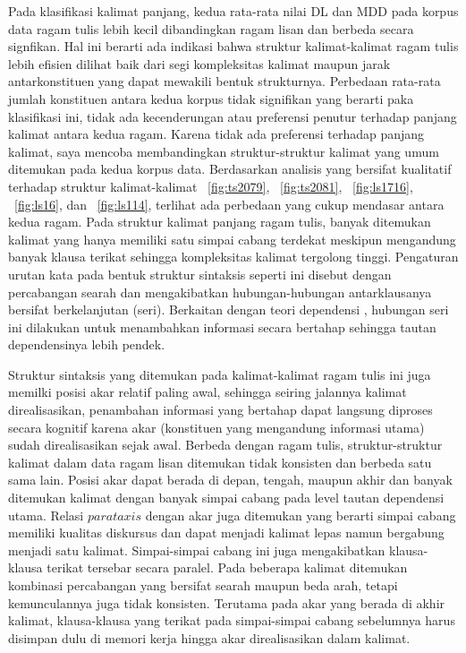 Pada klasifikasi kalimat panjang, kedua rata-rata nilai DL dan MDD pada korpus data ragam tulis lebih kecil dibandingkan ragam lisan dan berbeda secara signfikan. Hal ini berarti ada indikasi bahwa struktur kalimat-kalimat ragam tulis lebih efisien dilihat baik dari segi kompleksitas kalimat maupun jarak antarkonstituen yang dapat mewakili bentuk strukturnya. Perbedaan rata-rata jumlah konstituen antara kedua korpus tidak signifikan yang berarti paka klasifikasi ini, tidak ada kecenderungan atau preferensi penutur terhadap panjang kalimat antara kedua ragam. Karena tidak ada preferensi terhadap panjang kalimat, saya mencoba membandingkan struktur-struktur kalimat yang umum ditemukan pada kedua korpus data. Berdasarkan analisis yang bersifat kualitatif terhadap struktur kalimat-kalimat \pic~\ref{fig:ts2079}, \pic~\ref{fig:ts2081}, \pic~\ref{fig:ls1716}, \pic~\ref{fig:ls16}, dan \pic~\ref{fig:ls114}, terlihat ada perbedaan yang cukup mendasar antara kedua ragam. Pada struktur kalimat panjang ragam tulis, banyak ditemukan kalimat yang hanya memiliki satu simpai cabang terdekat meskipun mengandung banyak klausa terikat sehingga kompleksitas kalimat tergolong tinggi. Pengaturan urutan kata pada bentuk struktur sintaksis seperti ini disebut dengan percabangan searah dan mengakibatkan hubungan-hubungan antarklausanya bersifat berkelanjutan (seri). Berkaitan dengan teori dependensi \citep{tesniere1959elements, hawkins2014cross, gildea2010grammars}, hubungan seri ini dilakukan untuk menambahkan informasi secara bertahap sehingga tautan dependensinya lebih pendek. 

Struktur sintaksis yang ditemukan pada kalimat-kalimat ragam tulis ini juga memilki posisi akar relatif paling awal, sehingga seiring jalannya kalimat direalisasikan, penambahan informasi yang bertahap dapat langsung diproses secara kognitif karena akar (konstituen yang mengandung informasi utama) sudah direalisasikan sejak awal. Berbeda dengan ragam tulis, struktur-struktur kalimat dalam data ragam lisan ditemukan tidak konsisten dan berbeda satu sama lain. Posisi akar dapat berada di depan, tengah, maupun akhir dan banyak ditemukan kalimat dengan banyak simpai cabang pada level tautan dependensi utama. Relasi $parataxis$ dengan akar juga ditemukan yang berarti simpai cabang memiliki kualitas diskursus dan dapat menjadi kalimat lepas namun bergabung menjadi satu kalimat. Simpai-simpai cabang ini juga mengakibatkan klausa-klausa terikat tersebar secara paralel. Pada beberapa kalimat ditemukan kombinasi percabangan yang bersifat searah maupun beda arah, tetapi kemunculannya juga tidak konsisten. Terutama pada akar yang berada di akhir kalimat, klausa-klausa yang terikat pada simpai-simpai cabang sebelumnya harus disimpan dulu di memori kerja hingga akar direalisasikan dalam kalimat. 

